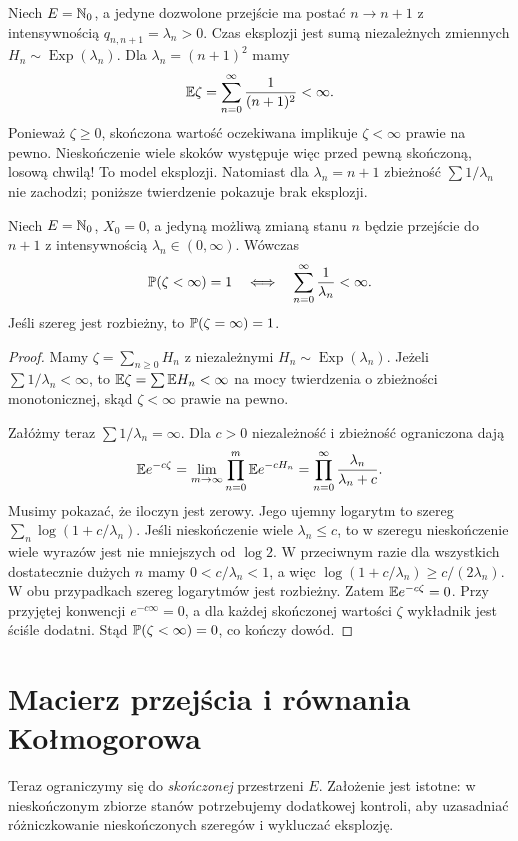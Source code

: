 \begin{przyklad}
Niech $E=\mathbb{N}_0$, a jedyne dozwolone przejście ma postać
$n\to n+1$ z intensywnością $q_{n,n+1}=\lambda_n>0$.
Czas eksplozji jest sumą niezależnych zmiennych
$H_n\sim\operatorname{Exp}(\lambda_n)$.
Dla $\lambda_n=(n+1)^2$ mamy
\[
\mathbb{E}\zeta=\sum_{n=0}^\infty\frac1{(n+1)^2}<\infty.
\]
Ponieważ $\zeta\ge0$, skończona wartość oczekiwana
implikuje $\zeta<\infty$ prawie na pewno.
Nieskończenie wiele skoków występuje więc przed pewną
skończoną, losową chwilą! To model eksplozji.
Natomiast dla $\lambda_n=n+1$ zbieżność $\sum1/\lambda_n$
nie zachodzi; poniższe twierdzenie pokazuje brak eksplozji.
\end{przyklad}

\begin{twierdzenie}
\label{thm:pure-birth-explosion}
Niech $E=\mathbb{N}_0$, $X_0=0$, a jedyną możliwą zmianą stanu
$n$ będzie przejście do $n+1$ z intensywnością
$\lambda_n\in(0,\infty)$. Wówczas
\[
\mathbb{P}(\zeta<\infty)=1
\quad\Longleftrightarrow\quad
\sum_{n=0}^\infty\frac1{\lambda_n}<\infty.
\]
Jeśli szereg jest rozbieżny, to $\mathbb{P}(\zeta=\infty)=1$.
\end{twierdzenie}
\begin{proof}
Mamy $\zeta=\sum_{n\ge0}H_n$ z niezależnymi
$H_n\sim\operatorname{Exp}(\lambda_n)$.
Jeżeli $\sum1/\lambda_n<\infty$, to
$\mathbb{E}\zeta=\sum\mathbb{E} H_n<\infty$ na mocy twierdzenia o
zbieżności monotonicznej, skąd $\zeta<\infty$ prawie na pewno.

Załóżmy teraz $\sum1/\lambda_n=\infty$.
Dla $c>0$ niezależność i zbieżność ograniczona dają
\[
\mathbb{E} e^{-c\zeta}
=\lim_{m\to\infty}\prod_{n=0}^m\mathbb{E} e^{-cH_n}
=\prod_{n=0}^\infty\frac{\lambda_n}{\lambda_n+c}.
\]
Musimy pokazać, że iloczyn jest zerowy. Jego ujemny logarytm
to szereg $\sum_n\log(1+c/\lambda_n)$.
Jeśli nieskończenie wiele $\lambda_n\le c$, to w szeregu
nieskończenie wiele wyrazów jest nie mniejszych od $\log2$.
W przeciwnym razie dla wszystkich dostatecznie dużych $n$
mamy $0<c/\lambda_n<1$, a więc
$\log(1+c/\lambda_n)\ge c/(2\lambda_n)$.
W obu przypadkach szereg logarytmów jest rozbieżny.
Zatem $\mathbb{E} e^{-c\zeta}=0$.
Przy przyjętej konwencji $e^{-c\infty}=0$, a dla każdej
skończonej wartości $\zeta$ wykładnik jest ściśle dodatni.
Stąd $\mathbb{P}(\zeta<\infty)=0$, co kończy dowód.
\end{proof}

\section{Macierz przejścia i równania Kołmogorowa}
Teraz ograniczymy się do \emph{skończonej} przestrzeni $E$.
Założenie jest istotne: w nieskończonym zbiorze stanów
potrzebujemy dodatkowej kontroli, aby uzasadniać różniczkowanie
nieskończonych szeregów i wykluczać eksplozję.

